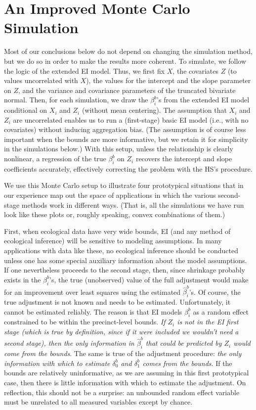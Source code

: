\documentclass[11pt,titlepage]{article}
\begin{document}
\section{An Improved Monte Carlo Simulation} \label{s:alt}

Most of our conclusions below do not depend on changing the simulation
method, but we do so in order to make the results more coherent.  To
simulate, we follow the logic of the extended EI model.  Thus, we
first fix $X$, the covariates $Z$ (to values uncorrelated with $X$),
the values for the intercept and the slope parameter on $Z$, and the
variance and covariance parameters of the truncated bivariate normal.
Then, for each simulation, we draw the $\beta_i^b$'s from the extended
EI model conditional on $X_i$ and $Z_i$ (without mean centering).  The
assumption that $X_i$ and $Z_i$ are uncorrelated enables us to run a
(first-stage) basic EI model (i.e., with no covariates) without
inducing aggregation bias.  (The assumption is of course less
important when the bounds are more informative, but we retain it for
simplicity in the simulations below.)  With this setup, unless the
relationship is clearly nonlinear, a regression of the true
$\beta_i^b$ on $Z_i$ recovers the intercept and slope coefficients
accurately, effectively correcting the problem with the HS's
procedure.

We use this Monte Carlo setup to illustrate four prototypical
situations that in our experience map out the space of applications in
which the various second-stage methods work in different ways.  (That
is, all the simulations we have run look like these plots or, roughly
speaking, convex combinations of them.)

First, when ecological data have very wide bounds, EI (and any method
of ecological inference) will be sensitive to modeling assumptions.
In many applications with data like these, no ecological inference
should be conducted unless one has some special auxiliary information
about the model assumptions.  If one nevertheless proceeds to the
second stage, then, since shrinkage probably exists in the
$\beta_i^b$'s, the true (unobserved) value of the full adjustment
would make for an improvement over least squares using the estimated
$\hat\beta_i^b$'s.  Of course, the true adjustment is not known and
needs to be estimated.  Unfortunately, it cannot be estimated
reliably.  The reason is that EI models $\beta_i^b$ as a random effect
constrained to be within the precinct-level bounds. \emph{If $Z_i$ is
  not in the EI first stage (which is true by definition, since if it
  were included we wouldn't need a second stage), then the only
  information in $\hat\beta_i^b$ that could be predicted by $Z_i$
  would come from the bounds}.  The same is true of the adjustment
procedure: \emph{the only information with which to estimate
  $\delta_0^b$ and $\delta_1^b$ comes from the bounds}.  If the bounds
are relatively uninformative, as we are assuming in this first
prototypical case, then there is little information with which to
estimate the adjustment.  On reflection, this should not be a
surprise: an unbounded random effect variable must be unrelated to all
measured variables except by chance.
\end{document}
